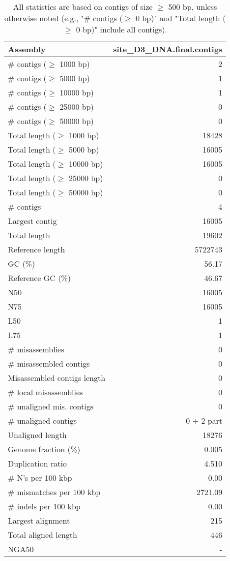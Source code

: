 \documentclass[12pt,a4paper]{article}
\begin{document}
\begin{table}[ht]
\begin{center}
\caption{All statistics are based on contigs of size $\geq$ 500 bp, unless otherwise noted (e.g., "\# contigs ($\geq$ 0 bp)" and "Total length ($\geq$ 0 bp)" include all contigs).}
\begin{tabular}{|l*{1}{|r}|}
\hline
Assembly & site\_D3\_DNA.final.contigs \\ \hline
\# contigs ($\geq$ 1000 bp) & 2 \\ \hline
\# contigs ($\geq$ 5000 bp) & 1 \\ \hline
\# contigs ($\geq$ 10000 bp) & 1 \\ \hline
\# contigs ($\geq$ 25000 bp) & 0 \\ \hline
\# contigs ($\geq$ 50000 bp) & 0 \\ \hline
Total length ($\geq$ 1000 bp) & 18428 \\ \hline
Total length ($\geq$ 5000 bp) & 16005 \\ \hline
Total length ($\geq$ 10000 bp) & 16005 \\ \hline
Total length ($\geq$ 25000 bp) & 0 \\ \hline
Total length ($\geq$ 50000 bp) & 0 \\ \hline
\# contigs & 4 \\ \hline
Largest contig & 16005 \\ \hline
Total length & 19602 \\ \hline
Reference length & 5722743 \\ \hline
GC (\%) & 56.17 \\ \hline
Reference GC (\%) & 46.67 \\ \hline
N50 & 16005 \\ \hline
N75 & 16005 \\ \hline
L50 & 1 \\ \hline
L75 & 1 \\ \hline
\# misassemblies & 0 \\ \hline
\# misassembled contigs & 0 \\ \hline
Misassembled contigs length & 0 \\ \hline
\# local misassemblies & 0 \\ \hline
\# unaligned mis. contigs & 0 \\ \hline
\# unaligned contigs & 0 + 2 part \\ \hline
Unaligned length & 18276 \\ \hline
Genome fraction (\%) & 0.005 \\ \hline
Duplication ratio & 4.510 \\ \hline
\# N's per 100 kbp & 0.00 \\ \hline
\# mismatches per 100 kbp & 2721.09 \\ \hline
\# indels per 100 kbp & 0.00 \\ \hline
Largest alignment & 215 \\ \hline
Total aligned length & 446 \\ \hline
NGA50 & - \\ \hline
\end{tabular}
\end{center}
\end{table}
\end{document}
